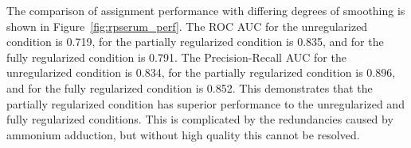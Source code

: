     The comparison of assignment performance with differing degrees of smoothing is
    shown in Figure~\ref{fig:rpserum_perf}. The ROC AUC for the unregularized condition
    is 0.719, for the partially regularized condition is 0.835, and for the fully
    regularized condition is 0.791. The Precision-Recall AUC for the unregularized condition
    is 0.834, for the partially regularized condition is 0.896, and for the fully regularized
    condition is 0.852. This demonstrates that the partially regularized condition has superior
    performance to the unregularized and fully regularized conditions. This is complicated by
    the redundancies caused by ammonium adduction, but without high quality \msn this cannot
    be resolved.

